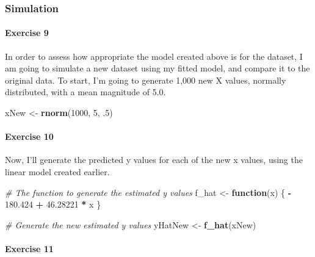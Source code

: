 \documentclass[]{article}
\newenvironment{Shaded}{\begin{snugshade}}{\end{snugshade}}
\newcommand{\KeywordTok}[1]{\textcolor[rgb]{0.13,0.29,0.53}{\textbf{#1}}}
\newcommand{\DecValTok}[1]{\textcolor[rgb]{0.00,0.00,0.81}{#1}}
\newcommand{\FloatTok}[1]{\textcolor[rgb]{0.00,0.00,0.81}{#1}}
\newcommand{\StringTok}[1]{\textcolor[rgb]{0.31,0.60,0.02}{#1}}
\newcommand{\CommentTok}[1]{\textcolor[rgb]{0.56,0.35,0.01}{\textit{#1}}}
\newcommand{\ControlFlowTok}[1]{\textcolor[rgb]{0.13,0.29,0.53}{\textbf{#1}}}
\newcommand{\OperatorTok}[1]{\textcolor[rgb]{0.81,0.36,0.00}{\textbf{#1}}}
\newcommand{\NormalTok}[1]{#1}
\let\oldparagraph\paragraph
\renewcommand{\paragraph}[1]{\oldparagraph{#1}\mbox{}}
\begin{document}
\newpage

\subsubsection{Simulation}\label{simulation}

\paragraph{Exercise 9}\label{exercise-9}

In order to assess how appropriate the model created above is for the
dataset, I am going to simulate a new dataset using my fitted model, and
compare it to the original data. To start, I'm going to generate 1,000
new X values, normally distributed, with a mean magnitude of 5.0.

\begin{Shaded}
\begin{Highlighting}[]
\NormalTok{xNew <-}\StringTok{ }\KeywordTok{rnorm}\NormalTok{(}\DecValTok{1000}\NormalTok{, }\DecValTok{5}\NormalTok{, .}\DecValTok{5}\NormalTok{)}
\end{Highlighting}
\end{Shaded}

\paragraph{Exercise 10}\label{exercise-10}

Now, I'll generate the predicted y values for each of the new x values,
using the linear model created earlier.

\begin{Shaded}
\begin{Highlighting}[]
\CommentTok{# The function to generate the estimated y values}
\NormalTok{f_hat <-}\StringTok{ }\ControlFlowTok{function}\NormalTok{(x) \{}
\OperatorTok{-}\StringTok{ }\FloatTok{180.424} \OperatorTok{+}\StringTok{ }\FloatTok{46.28221} \OperatorTok{*}\StringTok{ }\NormalTok{x}
\NormalTok{\}}

\CommentTok{# Generate the new estimated y values}
\NormalTok{yHatNew <-}\StringTok{ }\KeywordTok{f_hat}\NormalTok{(xNew)}
\end{Highlighting}
\end{Shaded}

\paragraph{Exercise 11}\label{exercise-11}
\end{document}
